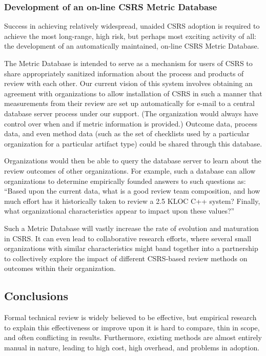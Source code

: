 \subsubsection{Development of an on-line CSRS Metric Database}

Success in achieving relatively widespread, unaided CSRS adoption is
required to achieve the most long-range, high risk, but perhaps most
exciting activity of all: the development of an automatically maintained,
on-line CSRS Metric Database.

The Metric Database is intended to serve as a mechanism for users of CSRS
to share appropriately sanitized information about the process and products
of review with each other.  Our current vision of this system involves
obtaining an agreement with organizations to allow installation of CSRS in
such a manner that measurements from their review are set up automatically
for e-mail to a central database server process under our support. (The
organization would always have control over when and if metric information
is provided.)  Outcome data, process data, and even method data (such as
the set of checklists used by a particular organization for a particular
artifact type) could be shared through this database.

Organizations would then be able to query the database server to learn
about the review outcomes of other organizations.  For example, such a
database can allow organizations to determine empirically founded answers
to such questions as: ``Based upon the current data, what is a good review
team composition, and how much effort has it historically taken to review a
2.5 KLOC C++ system? Finally, what organizational characteristics appear to
impact upon these values?''

Such a Metric Database will vastly increase the rate of evolution and
maturation in CSRS.  It can even lead to collaborative research efforts,
where several small organizations with similar characteristics might band
together into a partnership to collectively explore the impact of different
CSRS-based review methods on outcomes within their organization.


\subsection{Conclusions}

Formal technical review is widely believed to be effective, but empirical
research to explain this effectiveness or improve upon it is hard to
compare, thin in scope, and often conflicting in results.  Furthermore,
existing methods are almost entirely manual in nature, leading to high
cost, high overhead, and problems in adoption.  

